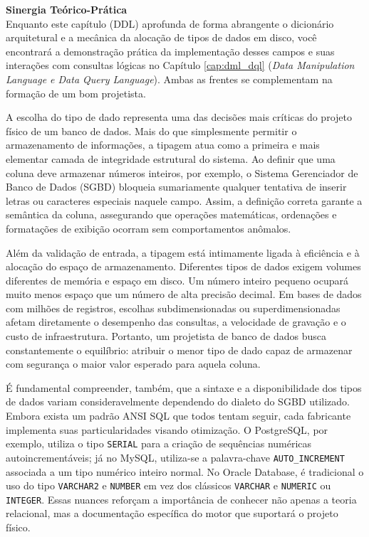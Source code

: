 \begin{quadro_dica}
\textbf{Sinergia Teórico-Prática} \\
Enquanto este capítulo (DDL) aprofunda de forma abrangente o dicionário arquitetural e a mecânica da alocação de tipos de dados em disco, você encontrará a demonstração prática da implementação desses campos e suas interações com consultas lógicas no Capítulo \ref{cap:dml_dql} (\textit{Data Manipulation Language e Data Query Language}). Ambas as frentes se complementam na formação de um bom projetista.
\end{quadro_dica}


A escolha do tipo de dado representa uma das decisões mais críticas do projeto físico de um banco de dados. Mais do que simplesmente permitir o armazenamento de informações, a tipagem atua como a primeira e mais elementar camada de integridade estrutural do sistema. Ao definir que uma coluna deve armazenar números inteiros, por exemplo, o Sistema Gerenciador de Banco de Dados (SGBD) bloqueia sumariamente qualquer tentativa de inserir letras ou caracteres especiais naquele campo. Assim, a definição correta garante a semântica da coluna, assegurando que operações matemáticas, ordenações e formatações de exibição ocorram sem comportamentos anômalos.

Além da validação de entrada, a tipagem está intimamente ligada à eficiência e à alocação do espaço de armazenamento. Diferentes tipos de dados exigem volumes diferentes de memória e espaço em disco. Um número inteiro pequeno ocupará muito menos espaço que um número de alta precisão decimal. Em bases de dados com milhões de registros, escolhas subdimensionadas ou superdimensionadas afetam diretamente o desempenho das consultas, a velocidade de gravação e o custo de infraestrutura. Portanto, um projetista de banco de dados busca constantemente o equilíbrio: atribuir o menor tipo de dado capaz de armazenar com segurança o maior valor esperado para aquela coluna.

É fundamental compreender, também, que a sintaxe e a disponibilidade dos tipos de dados variam consideravelmente dependendo do dialeto do SGBD utilizado. Embora exista um padrão ANSI SQL que todos tentam seguir, cada fabricante implementa suas particularidades visando otimização. O PostgreSQL, por exemplo, utiliza o tipo \texttt{SERIAL} para a criação de sequências numéricas autoincrementáveis; já no MySQL, utiliza-se a palavra-chave \texttt{AUTO\_INCREMENT} associada a um tipo numérico inteiro normal. No Oracle Database, é tradicional o uso do tipo \texttt{VARCHAR2} e \texttt{NUMBER} em vez dos clássicos \texttt{VARCHAR} e \texttt{NUMERIC} ou \texttt{INTEGER}. Essas nuances reforçam a importância de conhecer não apenas a teoria relacional, mas a documentação específica do motor que suportará o projeto físico.

